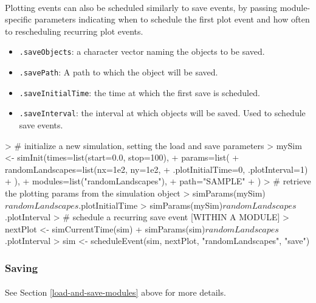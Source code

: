 \documentclass{article}
\begin{document}
\paragraph{}
Plotting events can also be scheduled similarly to save events, by passing module-specific parameters indicating when to schedule the first plot event and how often to rescheduling recurring plot events.

\begin{itemize}
  \item \texttt{.saveObjects}: a character vector naming the objects to be saved.
  \item \texttt{.savePath}: A path to which the object will be saved.
  \item \texttt{.saveInitialTime}: the time at which the first save is scheduled.
  \item \texttt{.saveInterval}: the interval at which objects will be saved. Used to schedule save events.
\end{itemize}

\begin{Schunk}
\begin{Sinput}
> # initialize a new simulation, setting the load and save parameters
> mySim <- simInit(times=list(start=0.0, stop=100),
+                  params=list(
+                    randomLandscapes=list(nx=1e2, ny=1e2,
+                                 .plotInitialTime=0, .plotInterval=1)
+                    ),
+                  modules=list("randomLandscapes"),
+                  path="SAMPLE"
+ )
> # retrieve the plotting params from the simulation object
> simParams(mySim)$randomLandscapes$.plotInitialTime
> simParams(mySim)$randomLandscapes$.plotInterval
> # schedule a recurring save event [WITHIN A MODULE]
> nextPlot <- simCurrentTime(sim) + simParams(sim)$randomLandscapes$.plotInterval
> sim <- scheduleEvent(sim, nextPlot, "randomLandscapes", "save")
\end{Sinput}
\end{Schunk}

\subsubsection{Saving}

\paragraph{}
See Section \ref{load-and-save-modules} above for more details.

\newpage
\appendix
\renewcommand{\thesection}{}
\end{document}
